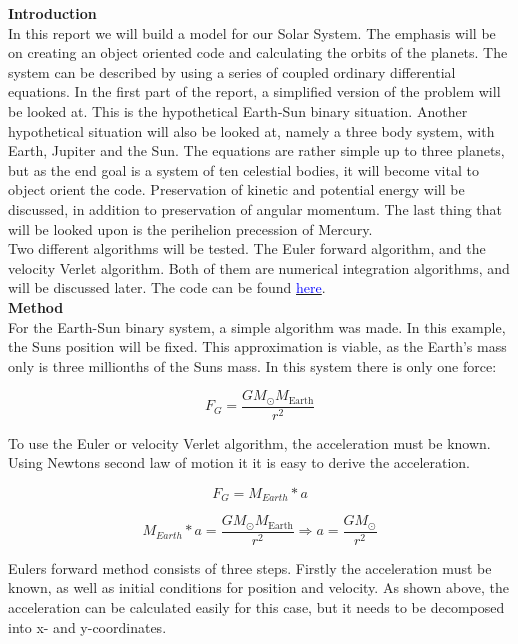 \documentclass[10pt,a4paper]{article}
\begin{document}
{\LARGE\bf
Introduction
}\\

\noindent In this report we will build a model for our Solar System. The emphasis will be on creating an object oriented code and calculating the orbits of the planets. The system can be described by using a series of coupled ordinary differential equations. In the first part of the report, a simplified version of the problem will be looked at. This is the hypothetical Earth-Sun binary situation. Another hypothetical situation will also be looked at, namely a three body system, with Earth, Jupiter and the Sun. The equations are rather simple up to three planets, but as the end goal is a system of ten celestial bodies, it will become vital to object orient the code. Preservation of kinetic and potential energy will be discussed, in addition to preservation of angular momentum. The last thing that will be looked upon is the perihelion precession of Mercury. \\

\noindent Two different algorithms will be tested. The Euler forward algorithm, and the velocity Verlet algorithm. Both of them are numerical integration algorithms, and will be discussed later. The code can be found \href{https://github.com/VemundStenbekkThorkildsen/Assigment3}{\textcolor{blue}{here}}. \\   





{\LARGE\bf
Method
}\\

\noindent For the Earth-Sun binary system, a simple algorithm was made. In this example, the Suns position will be fixed. This approximation is viable, as the Earth's mass only is three millionths of the Suns mass. In this system there is only one force:


$$
F_G=\frac{GM_{\odot}M_{\mathrm{Earth}}}{r^2}
$$

\noindent To use the Euler or velocity Verlet algorithm, the acceleration must be known. Using Newtons second law of motion it it is easy to derive the acceleration. 


$$F_G=M_{Earth}*a $$

$$M_{Earth}*a=\frac{GM_{\odot}M_{\mathrm{Earth}}}{r^2} \Rightarrow a=\frac{GM_{\odot}}{r^2}$$

\noindent Eulers forward method consists of three steps. Firstly the acceleration must be known, as well as initial conditions for position and velocity. As shown above, the acceleration can be calculated easily for this case, but it needs to be decomposed into x- and y-coordinates. 
\end{document}
